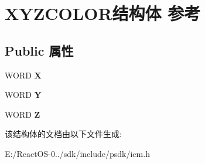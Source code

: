 \hypertarget{struct_x_y_z_c_o_l_o_r}{}\section{X\+Y\+Z\+C\+O\+L\+O\+R结构体 参考}
\label{struct_x_y_z_c_o_l_o_r}
\subsection*{Public 属性}
\begin{DoxyCompactItemize}
\item 
\mbox{\label{struct_x_y_z_c_o_l_o_r_a054629ce2a7c6dcb3186cc8cd06a01ca}} 
W\+O\+RD {\bfseries X}
\item 
\mbox{\label{struct_x_y_z_c_o_l_o_r_a2827e5969dd33479e7d38e3da07dab7d}} 
W\+O\+RD {\bfseries Y}
\item 
\mbox{\label{struct_x_y_z_c_o_l_o_r_a6d5cb126fdc9c10f5713fc8aeab131f0}} 
W\+O\+RD {\bfseries Z}
\end{DoxyCompactItemize}


该结构体的文档由以下文件生成\+:\begin{DoxyCompactItemize}
\item 
E\+:/\+React\+O\+S-\/0../sdk/include/psdk/icm.\+h\end{DoxyCompactItemize}
